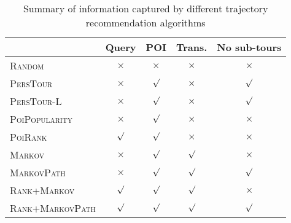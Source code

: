 

\begin{table}[t]
\caption{Summary of information captured by different trajectory recommendation algorithms}
\label{tab:algsummary}
\centering
\setlength{\tabcolsep}{3pt} %
\begin{tabular}{l|*{4}{c}} \hline
                                & Query    & POI      & Trans.     & No sub-tours \\ \hline 
\textsc{Random}                 & $\times$ & $\times$ & $\times$   & $\times$     \\ 
\textsc{PersTour}\cite{ijcai15} & $\times$ & $\surd$  & $\times$   & $\surd$      \\ 
\textsc{PersTour-L}             & $\times$ & $\surd$  & $\times$   & $\surd$      \\ 
\textsc{PoiPopularity}          & $\times$ & $\surd$  & $\times$   & $\times$     \\ 
\textsc{PoiRank}                & $\surd$  & $\surd$  & $\times$   & $\times$     \\ 
\textsc{Markov}                 & $\times$ & $\surd$  & $\surd$    & $\times$     \\ 
\textsc{MarkovPath}             & $\times$ & $\surd$  & $\surd$    & $\surd$      \\ 
\textsc{Rank+Markov}            & $\surd$  & $\surd$  & $\surd$    & $\times$     \\ 
\textsc{Rank+MarkovPath}        & $\surd$  & $\surd$  & $\surd$    & $\surd$      \\ 
\hline
\end{tabular}
\end{table}
